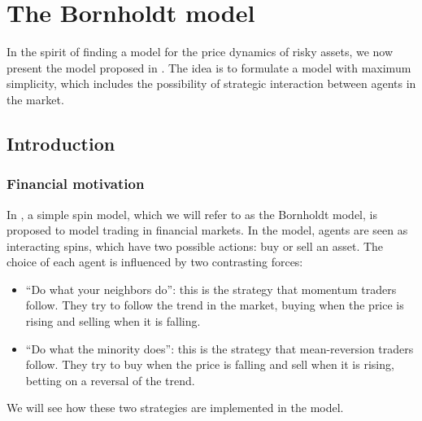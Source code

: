 \chapter{The Bornholdt model}\label{ch:bornholdt_model}
In the spirit of finding a model for the price dynamics of risky assets, we now present the model proposed in \cite{bornholdt}. The idea is to formulate a model with maximum simplicity, which includes the possibility of strategic interaction between agents in the market.



\section{Introduction}
\subsection{Financial motivation}
In \cite{bornholdt}, a simple spin model, which we will refer to as the Bornholdt model, is proposed to model trading in financial markets. In the model, agents are seen as interacting spins, which have two possible actions: buy or sell an asset. The choice of each agent is influenced by two contrasting forces:
\begin{itemize}
    \item ``Do what your neighbors do'': this is the strategy that momentum traders follow. They try to follow the trend in the market, buying when the price is rising and selling when it is falling.
    \item ``Do what the minority does'': this is the strategy that mean-reversion traders follow. They try to buy when the price is falling and sell when it is rising, betting on a reversal of the trend.
\end{itemize}
We will see how these two strategies are implemented in the model.

